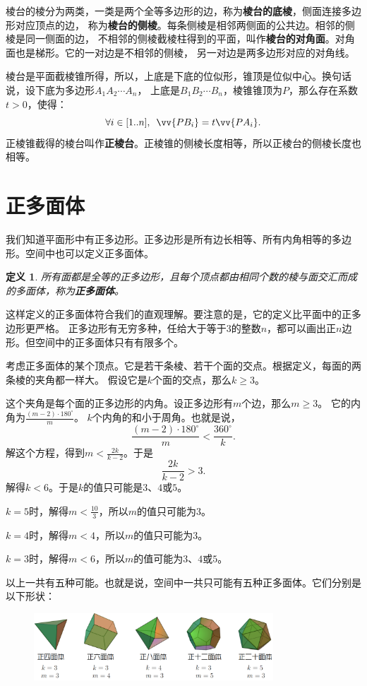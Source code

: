 \documentclass[12pt,UTF8]{ctexbook}
\newtheorem{df}{定义}[section]
\begin{document}
棱台的棱分为两类，一类是两个全等多边形的边，称为\textbf{棱台的底棱}，侧面连接多边形对应顶点的边，
称为\textbf{棱台的侧棱}。每条侧棱是相邻两侧面的公共边。相邻的侧棱是同一侧面的边，
不相邻的侧棱截棱柱得到的平面，叫作\textbf{棱台的对角面}。对角面也是梯形。它的一对边是不相邻的侧棱，
另一对边是两多边形对应的对角线。

棱台是平面截棱锥所得，所以，上底是下底的位似形，锥顶是位似中心。换句话说，设下底为多边形$A_1A_2\cdots A_n$，
上底是$B_1B_2\cdots B_n$，棱锥锥顶为$P$，那么存在系数$t>0$，使得：
$$\forall i\in[1..n],\,\,\,\vv{PB_i} = t\vv{PA_i}.$$
正棱锥截得的棱台叫作\textbf{正棱台}。正棱锥的侧棱长度相等，所以正棱台的侧棱长度也相等。

\section{正多面体}
我们知道平面形中有正多边形。正多边形是所有边长相等、所有内角相等的多边形。空间中也可以定义正多面体。

\begin{df}
    所有面都是全等的正多边形，且每个顶点都由相同个数的棱与面交汇而成的多面体，称为\textbf{正多面体}。
\end{df}

这样定义的正多面体符合我们的直观理解。要注意的是，它的定义比平面中的正多边形更严格。
正多边形有无穷多种，任给大于等于$3$的整数$n$，都可以画出正$n$边形。但空间中的正多面体只有有限多个。

考虑正多面体的某个顶点。它是若干条棱、若干个面的交点。根据定义，每面的两条棱的夹角都一样大。
假设它是$k$个面的交点，那么$k \geqslant 3$。

这个夹角是每个面的正多边形的内角。设正多边形有$m$个边，那么$m \geqslant 3$。
它的内角为$\frac{(m - 2)\cdot 180^\circ}{m}$。
$k$个内角的和小于周角。也就是说，
$$ \frac{(m - 2)\cdot 180^\circ}{m} < \frac{360^\circ}{k}.$$
解这个方程，得到$m < \frac{2k}{k - 2}$。于是
$$ \frac{2k}{k - 2} > 3.$$
解得$k < 6$。于是$k$的值只可能是$3$、$4$或$5$。

$k = 5$时，解得$m < \frac{10}{3}$，所以$m$的值只可能为$3$。

$k = 4$时，解得$m < 4$，所以$m$的值只可能为$3$。

$k = 3$时，解得$m < 6$，所以$m$的值可能为$3$、$4$或$5$。

以上一共有五种可能。也就是说，空间中一共只可能有五种正多面体。它们分别是以下形状：

\begin{figure}[h]
    \vspace{4pt}
    \centering
    \includegraphics[width=0.8\textwidth]{tu/正多面体1.png}
    \captionsetup{justification=centering}
\end{figure}
\end{document}
